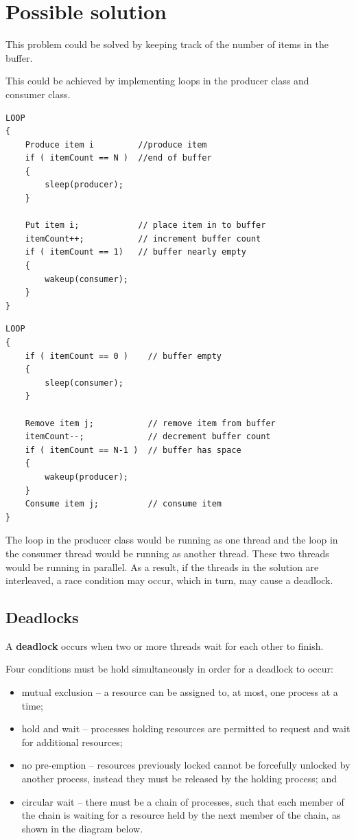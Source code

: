 \documentclass[a4paper]{systems-software}
\begin{document}
\section*{Possible solution}

This problem could be solved by keeping track of the number of items in the buffer.

This could be achieved by implementing loops in the producer class and consumer class.

\newpage

\begin{lstlisting}[title={Producer class}]
LOOP
{
	Produce item i         //produce item
	if ( itemCount == N )  //end of buffer
	{
		sleep(producer);
	}

	Put item i;            // place item in to buffer
	itemCount++;           // increment buffer count
	if ( itemCount == 1)   // buffer nearly empty
	{
		wakeup(consumer);
	}
}
\end{lstlisting}

\begin{lstlisting}[title={Consumer class}]
LOOP
{
	if ( itemCount == 0 )    // buffer empty
	{
		sleep(consumer);
	}

	Remove item j;           // remove item from buffer
	itemCount--;             // decrement buffer count
	if ( itemCount == N-1 )  // buffer has space
	{
		wakeup(producer);
	}
	Consume item j;          // consume item
}
\end{lstlisting}

The loop in the producer class would be running as one thread and the loop in the consumer thread would be running as another thread. These two threads would be running in parallel. As a result, if the threads in the solution are interleaved, a race condition may occur, which in turn, may cause a deadlock.


\subsection*{Deadlocks}

A \textbf{deadlock} occurs when two or more threads wait for each other to finish.

Four conditions must be hold simultaneously in order for a deadlock to occur:
\begin{itemize}
	\item mutual exclusion -- a resource can be assigned to, at most, one process at a time;
	\item hold and wait -- processes holding resources are permitted to request and wait for additional resources;
	\item no pre-emption	 -- resources previously locked cannot be forcefully unlocked by another process, instead they must be released by the holding process; and
	\item circular wait -- there must be a chain of processes, such that each member of the chain is waiting for a resource held by the next member of the chain, as shown in the diagram below.
\end{itemize}
\end{document}
